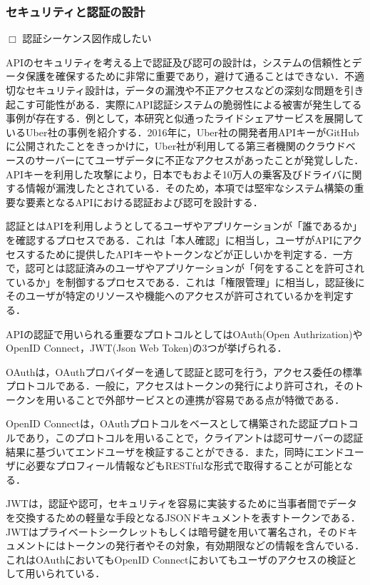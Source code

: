       \subsubsection{セキュリティと認証の設計}
        \label{sec:セキュリティと認証の設計}
          \par $\Box$ 認証シーケンス図作成したい
          \par APIのセキュリティを考える上で認証及び認可の設計は，システムの信頼性とデータ保護を確保するために非常に重要であり，避けて通ることはできない．不適切なセキュリティ設計は，データの漏洩や不正アクセスなどの深刻な問題を引き起こす可能性がある．実際にAPI認証システムの脆弱性による被害が発生してる事例が存在する．例として，本研究と似通ったライドシェアサービスを展開しているUber社の事例を紹介する．2016年に，Uber社の開発者用APIキーがGitHubに公開されたことをきっかけに，Uber社が利用してる第三者機関のクラウドベースのサーバーにてユーザデータに不正なアクセスがあったことが発覚しした．APIキーを利用した攻撃により，日本でもおよそ10万人の乗客及びドライバに関する情報が漏洩したとされている．そのため，本項では堅牢なシステム構築の重要な要素となるAPIにおける認証および認可を設計する．
          \par 認証とはAPIを利用しようとしてるユーザやアプリケーションが「誰であるか」を確認するプロセスである．これは「本人確認」に相当し，ユーザがAPIにアクセスするために提供したAPIキーやトークンなどが正しいかを判定する．一方で，認可とは認証済みのユーザやアプリケーションが「何をすることを許可されているか」を制御するプロセスである．これは「権限管理」に相当し，認証後にそのユーザが特定のリソースや機能へのアクセスが許可されているかを判定する．
          \par APIの認証で用いられる重要なプロトコルとしてはOAuth(Open Authrization)やOpenID Connect，JWT(Json Web Token)の3つが挙げられる．
          \par OAuthは，OAuthプロバイダーを通して認証と認可を行う，アクセス委任の標準プロトコルである．一般に，アクセスはトークンの発行により許可され，そのトークンを用いることで外部サービスとの連携が容易である点が特徴である．
          \par OpenID Connectは，OAuthプロトコルをベースとして構築された認証プロトコルであり，このプロトコルを用いることで，クライアントは認可サーバーの認証結果に基づいてエンドユーザを検証することができる．また，同時にエンドユーザに必要なプロフィール情報などもRESTfulな形式で取得することが可能となる．
          \par JWTは，認証や認可，セキュリティを容易に実装するために当事者間でデータを交換するための軽量な手段となるJSONドキュメントを表すトークンである．JWTはプライベートシークレットもしくは暗号鍵を用いて署名され，そのドキュメントにはトークンの発行者やその対象，有効期限などの情報を含んでいる．これはOAuthにおいてもOpenID Connectにおいてもユーザのアクセスの検証として用いられている．

